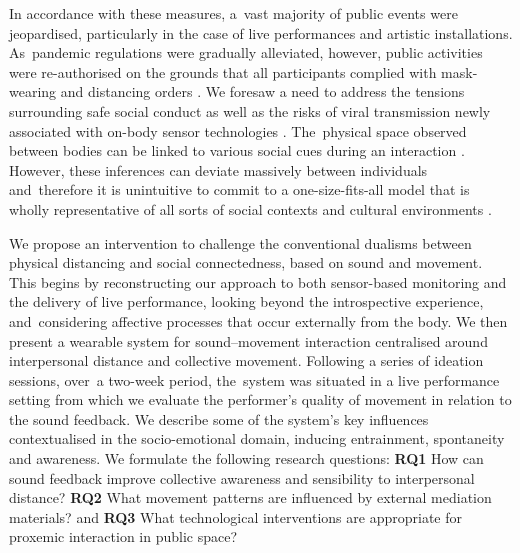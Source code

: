 {In accordance with these measures, a~vast majority of public events were jeopardised, particularly in the case of live performances and artistic installations. As~pandemic regulations were gradually alleviated, however, public activities were re-authorised on the grounds that all participants complied with mask-wearing and distancing orders \citep{direcao-geral_da_saude_dgs_covid-19_2020}. We foresaw a need to address the tensions surrounding safe social conduct as well as the risks of viral transmission newly associated with on-body sensor technologies \citep{seshadri_wearable_2020,jeong_continuous_2020}. The~physical space observed between bodies can be linked to various social cues during an interaction \citep{kroczek_interpersonal_2020,vinciarelli_towards_2011,sundstrom_interpersonal_1976}. However, these inferences can deviate massively between individuals and~therefore it is unintuitive to commit to a one-size-fits-all model that is wholly representative of all sorts of social contexts and cultural environments \citep{yu_investigation_2020,sorokowska_preferred_2017}.

We propose an intervention to challenge the conventional dualisms between physical distancing and social connectedness, based on sound and movement. This begins by reconstructing our approach to both sensor-based monitoring and the delivery of live performance, looking beyond the introspective experience, and~considering affective processes that occur externally from the body. We then present a wearable system for sound--movement interaction centralised around interpersonal distance and collective movement. Following a series of ideation sessions, over~a two-week period, the~system was situated in a live performance setting from which we evaluate the performer's quality of movement in relation to the sound feedback. We describe some of the system’s key influences contextualised in the socio-emotional domain, inducing entrainment, spontaneity and awareness. We formulate the following research questions: \textbf{RQ1} How can sound feedback improve collective awareness and sensibility to interpersonal distance? \textbf{RQ2} What movement patterns are influenced by external mediation materials? and \textbf{RQ3} What technological interventions are appropriate for proxemic interaction in public space?

}
